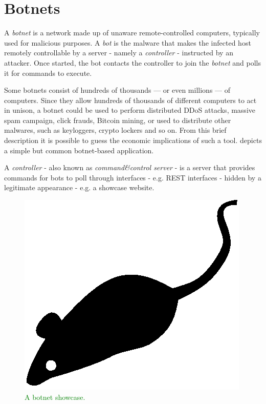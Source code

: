 \section{Botnets}
\label{sec:botnets}

A \textit{botnet} is a network made up of unaware remote-controlled computers, typically used for malicious purposes.
A \textit{bot} is the malware that makes the infected host remotely controllable by a server - namely a \textit{controller} -  instructed by an attacker. Once started, the bot contacts the controller to join the \textit{botnet} and polls it for commands to execute.

Some botnets consist of hundreds of thousands — or even millions — of computers. Since they allow hundreds of thousands of different computers to act in unison, a botnet could be used to perform distributed DDoS attacks, massive spam campaign, click frauds, Bitcoin mining, or used to distribute other malwares, such as keyloggers, crypto lockers and so on. From this brief description it is possible to guess the economic implications of such a tool.  depicts a simple but common botnet-based application.

A \textit{controller} - also known as \textit{command\&control server} - is a server that provides commands for bots to poll through interfaces - e.g. REST interfaces - hidden by a legitimate appearance - e.g. a showcase website.

\begin{figure}[tp]
  \centering
  \includegraphics{./fig/acmlarge-mouse}
  \caption{\textcolor{green}{A botnet showcase.}}
    \label{fig:botnet-showcase}
\end{figure}

